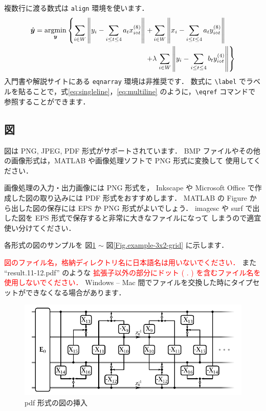 \documentclass[dvipdfmx,disablejfam,nosetpagesize,12pt]{jsbook}
\begin{document}
複数行に渡る数式は \verb+align+ 環境を使います．
\begin{align}
   \hat{\bm{y}} = \argmin_{\bm{y}}
   \left\{
      \sum_{i\in W}
         \left\|
            y_i - \sum_{i\leq t\leq 4} a_t x_{i\diamond t}^{(8)}
         \right\|
   \right.
   + &          %
      \sum_{i\in W}
         \left\|
            x_i - \sum_{i\leq t\leq 4} a_t y_{i\diamond t}^{(8)}
         \right\|
   \nonumber \\ %
   + &
   \lambda  
   \left.
      \sum_{i\in W}
         \left\|
            y_i - \sum_{i\leq t\leq 4} b_t y_{i\diamond t}^{(4)}
         \right\|
   \right\}
   \label{eq:multiline}
\end{align}
入門書や解説サイトにある \verb+eqnarray+ 環境は非推奨です．
数式に \verb+\label+ でラベルを貼ることで，式\eqref{eq:singleline}，\eqref{eq:multiline}
のように，\verb+\eqref+ コマンドで参照することができます．

\subsection{図}
\label{Sec.basis.fig}
図は PNG, JPEG, PDF 形式がサポートされています．
BMP ファイルやその他の画像形式は，MATLAB や画像処理ソフトで PNG 形式に変換して
使用してください．


画像処理の入力・出力画像には PNG 形式を，
Inkscape や Microsoft Office で作成した図の取り込みには PDF 形式をおすすめします．
MATLAB の Figure から出した図の保存には EPS か PNG 形式がよいでしょう．
imagesc や surf で出した図を EPS 形式で保存すると非常に大きなファイルになって
しまうので適宜使い分けてください．

各形式の図のサンプルを
図\ref{Fig.example-pdf} $\sim$ 図\ref{Fig.example-3x2-grid} に示します．

\textcolor{red}{図のファイル名，格納ディレクトリ名に日本語名は用いないでください．}
また
``result.11-12.pdf'' のような
\textcolor{red}{拡張子以外の部分にドット ( . ) を含むファイル名を使用しないでください．}
Windows -- Mac 間でファイルを交換した時にタイプセットができなくなる場合があります．

\begin{figure}[tp]
   \centering
   \includegraphics[width=.7\hsize]{figure/example-pdf.pdf}
   \caption{pdf 形式の図の挿入}
   \label{Fig.example-pdf}
\end{figure}
\end{document}
